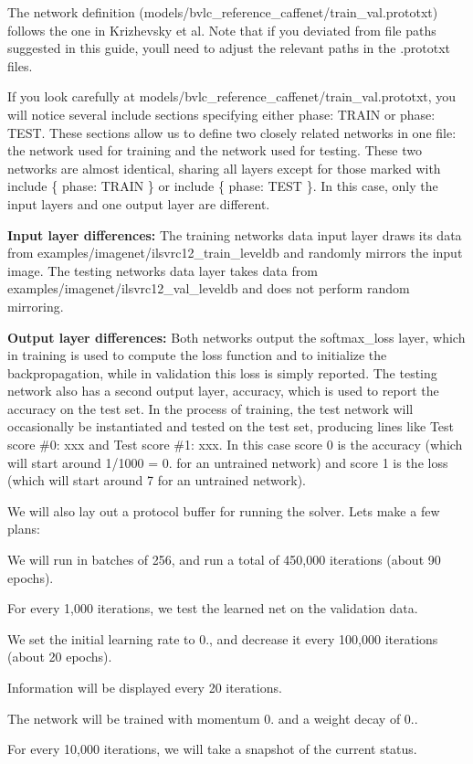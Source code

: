 The network definition ({\ttfamily models/bvlc\+\_\+reference\+\_\+caffenet/train\+\_\+val.\+prototxt}) follows the one in Krizhevsky et al. Note that if you deviated from file paths suggested in this guide, you\textquotesingle{}ll need to adjust the relevant paths in the {\ttfamily .prototxt} files.

If you look carefully at {\ttfamily models/bvlc\+\_\+reference\+\_\+caffenet/train\+\_\+val.\+prototxt}, you will notice several {\ttfamily include} sections specifying either {\ttfamily phase\+: T\+R\+A\+IN} or {\ttfamily phase\+: T\+E\+ST}. These sections allow us to define two closely related networks in one file\+: the network used for training and the network used for testing. These two networks are almost identical, sharing all layers except for those marked with {\ttfamily include \{ phase\+: T\+R\+A\+IN \}} or {\ttfamily include \{ phase\+: T\+E\+ST \}}. In this case, only the input layers and one output layer are different.

{\bfseries Input layer differences\+:} The training network\textquotesingle{}s {\ttfamily data} input layer draws its data from {\ttfamily examples/imagenet/ilsvrc12\+\_\+train\+\_\+leveldb} and randomly mirrors the input image. The testing network\textquotesingle{}s {\ttfamily data} layer takes data from {\ttfamily examples/imagenet/ilsvrc12\+\_\+val\+\_\+leveldb} and does not perform random mirroring.

{\bfseries Output layer differences\+:} Both networks output the {\ttfamily softmax\+\_\+loss} layer, which in training is used to compute the loss function and to initialize the backpropagation, while in validation this loss is simply reported. The testing network also has a second output layer, {\ttfamily accuracy}, which is used to report the accuracy on the test set. In the process of training, the test network will occasionally be instantiated and tested on the test set, producing lines like {\ttfamily Test score \#0\+: xxx} and {\ttfamily Test score \#1\+: xxx}. In this case score 0 is the accuracy (which will start around 1/1000 = 0. for an untrained network) and score 1 is the loss (which will start around 7 for an untrained network).

We will also lay out a protocol buffer for running the solver. Let\textquotesingle{}s make a few plans\+:


\begin{DoxyItemize}
\item We will run in batches of 256, and run a total of 450,000 iterations (about 90 epochs).
\item For every 1,000 iterations, we test the learned net on the validation data.
\item We set the initial learning rate to 0., and decrease it every 100,000 iterations (about 20 epochs).
\item Information will be displayed every 20 iterations.
\item The network will be trained with momentum 0. and a weight decay of 0..
\item For every 10,000 iterations, we will take a snapshot of the current status.
\end{DoxyItemize}


